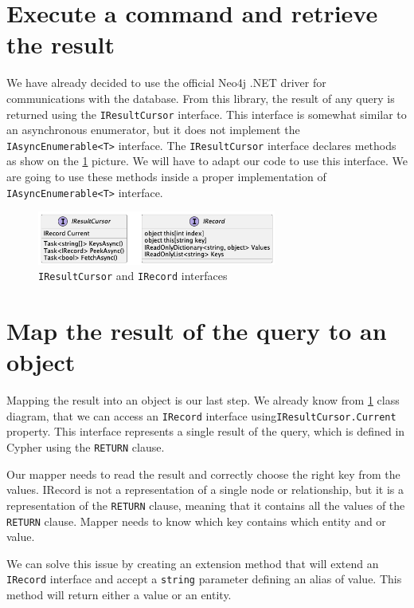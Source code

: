 \section{Execute a command and retrieve the result}

We have already decided to use the official Neo4j .NET driver for communications with the database.
From this library, the result of any query is returned using the \texttt{IResultCursor} interface.
This interface is somewhat similar to an asynchronous enumerator, but it does not implement the \texttt{IAsyncEnumerable<T>} interface.
The \texttt{IResultCursor} interface declares methods as show on the \ref{fig:iresinterface} picture. We will have to adapt our code to use this interface.
We are going to use these methods inside a proper implementation of \texttt{IAsyncEnumerable<T>} interface.

\begin{figure}[H]
    \centering
    \includegraphics[width=0.7\textwidth]{content/IResultCursor.png}
    \caption{\texttt{IResultCursor} and \texttt{IRecord} interfaces}
    \label{fig:iresinterface}
\end{figure}

\section{Map the result of the query to an object}

Mapping the result into an object is our last step.
We already know from \ref{fig:iresinterface} class diagram, that we can access an \texttt{IRecord} interface using\linebreak \texttt{IResultCursor.Current} property.
This interface represents a single result of the query, which is defined in Cypher using the \texttt{RETURN} clause.

Our mapper needs to read the result and correctly choose the right key from the values.
IRecord is not a representation of a single node or relationship, but it is a representation of the \texttt{RETURN} clause, meaning that it contains all the values of the \texttt{RETURN} clause.
Mapper needs to know which key contains which entity and or value.

We can solve this issue by creating an extension method that will extend an \texttt{IRecord} interface and accept a \texttt{string} parameter defining an alias of value.
This method will return either a value or an entity.

